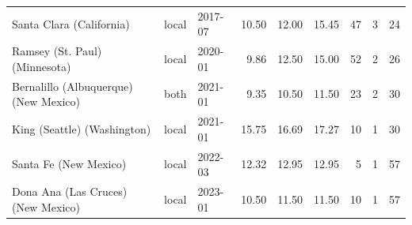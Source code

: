 \begin{tabular}{lllrrrrrr}
Santa Clara (California) & local & 2017-07 & 10.50 & 12.00 & 15.45 & 47 & 3 & 24 \\
Ramsey (St. Paul) (Minnesota) & local & 2020-01 & 9.86 & 12.50 & 15.00 & 52 & 2 & 26 \\
Bernalillo (Albuquerque) (New Mexico) & both & 2021-01 & 9.35 & 10.50 & 11.50 & 23 & 2 & 30 \\
King (Seattle) (Washington) & local & 2021-01 & 15.75 & 16.69 & 17.27 & 10 & 1 & 30 \\
Santa Fe (New Mexico) & local & 2022-03 & 12.32 & 12.95 & 12.95 & 5 & 1 & 57 \\
Dona Ana (Las Cruces) (New Mexico) & local & 2023-01 & 10.50 & 11.50 & 11.50 & 10 & 1 & 57 \\
\bottomrule
\end{tabular}
